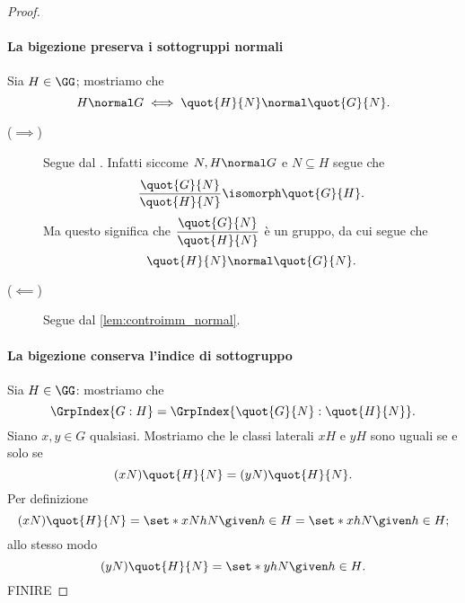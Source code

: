 \begin{proof}
    \paragraph{La bigezione preserva i sottogruppi normali} Sia $H \in \GG$; mostriamo che \[
        H \normal G \iff \quot{H}{N} \normal \quot{G}{N}.    
    \] \begin{description}
        \item[($\implies$)] Segue dal . Infatti siccome $N, H \normal G$ e $N \subseteq H$ segue che \[
            \frac{\quot{G}{N}}{\quot{H}{N}} \isomorph \quot{G}{H}.    
        \] Ma questo significa che $\dfrac{\quot{G}{N}}{\quot{H}{N}}$ è un gruppo, da cui segue che \[
            \quot{H}{N} \normal \quot{G}{N}.
        \]
        \item[($\impliedby$)] Segue dal \autoref{lem:controimm_normal}.
    \end{description}

    \paragraph{La bigezione conserva l'indice di sottogruppo} Sia $H \in \GG$: mostriamo che \[
        \GrpIndex{G : H} = \GrpIndex{\quot{G}{N} : \quot{H}{N}}.    
    \] Siano $x, y \in G$ qualsiasi. Mostriamo che le classi laterali $xH$ e $yH$ sono uguali se e solo se \[
        (xN)\quot{H}{N} = (yN)\quot{H}{N}.    
    \] Per definizione \[
        (xN)\quot{H}{N} = \set*{xNhN \given h \in H} = \set*{xhN \given h \in H};    
    \] allo stesso modo \[
        (yN)\quot{H}{N} = \set*{yhN \given h \in H}.    
    \] FINIRE
\end{proof}
